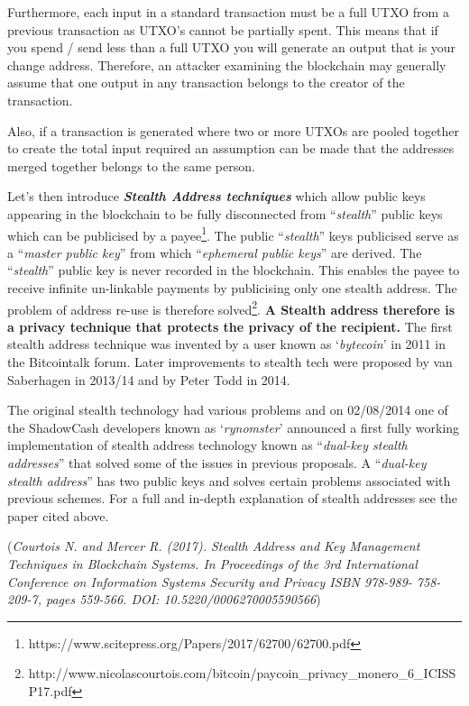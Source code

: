 Furthermore, each input in a standard transaction must be a full UTXO
from a previous transaction as UTXO’s cannot be partially spent. This
means that if you spend / send less than a full UTXO you will generate
an output that is your change address. Therefore, an attacker examining
the blockchain may generally assume that one output in any transaction
belongs to the creator of the transaction.



Also, if a transaction is generated where two or more UTXOs are pooled
together to create the total input required an assumption can be made
that the addresses merged together belongs to the same person.



Let’s then introduce \textbf{\textit{Stealth Address techniques}} which 
allow public keys appearing in the blockchain to be fully disconnected 
from “\textit{stealth}” public keys which can be publicised by a 
payee\footnote{https://www.scitepress.org/Papers/2017/62700/62700.pdf}. 
The public “\textit{stealth}” keys publicised serve as a 
“\textit{master public key}” from which “\textit{ephemeral public
keys}” are derived. The “\textit{stealth}” public key is never recorded in the
blockchain. This enables the payee to receive infinite un-linkable
payments by publicising only one stealth address. The problem of address
re-use is therefore 
solved\footnote{http://www.nicolascourtois.com/bitcoin/paycoin\_privacy\_monero\_6\_ICISSP17.pdf}. 
\textbf{A Stealth address therefore is a privacy technique that protects 
the privacy of the recipient.} The first stealth address technique was 
invented by a user known as ‘\textit{bytecoin}’ in 2011 in the Bitcointalk 
forum. Later improvements to stealth tech were proposed by van Saberhagen 
in 2013/14 and by Peter Todd in 2014.



The original stealth technology had various problems and on 02/08/2014 one
of the ShadowCash developers known as ‘\textit{rynomster}’ announced a 
first fully working implementation of stealth address technology known as 
“\textit{dual-key stealth addresses}” that solved some of the issues in 
previous proposals. A “\textit{dual-key stealth address}” has two public 
keys and solves certain problems associated with previous schemes. For a 
full and in-depth explanation of stealth addresses see the paper cited above.



(\textit{Courtois N. and Mercer R. (2017). Stealth Address and Key Management
Techniques in Blockchain Systems. In Proceedings of the 3rd International
Conference on Information Systems Security and Privacy ISBN 978-989-
758-209-7, pages 559-566. DOI: 10.5220/0006270005590566})



